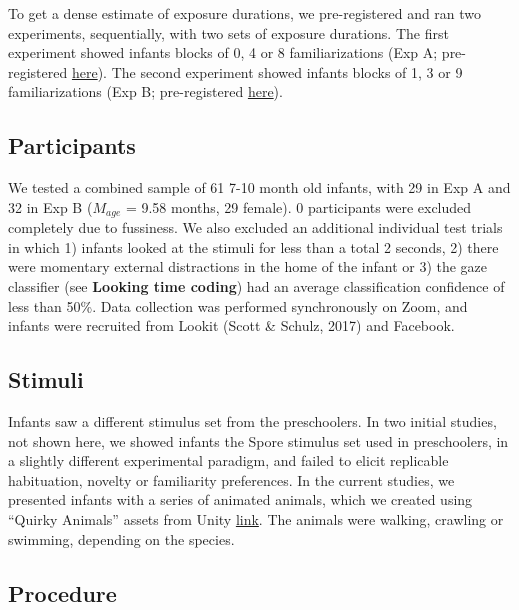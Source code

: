 \documentclass[10pt, letterpaper]{article}
\begin{document}
To get a dense estimate of exposure durations, we pre-registered and ran
two experiments, sequentially, with two sets of exposure durations. The
first experiment showed infants blocks of 0, 4 or 8 familiarizations
(Exp A; pre-registered
\href{https://osf.io/gux4f/?view_only=b4d6d0118dfa41a79fb431d389f4fecc}{here}).
The second experiment showed infants blocks of 1, 3 or 9
familiarizations (Exp B; pre-registered
\href{https://osf.io/w6pgu/?view_only=39ee108159884761a0c5bc68d11918df}{here}).

\hypertarget{participants-1}{%
\subsection{Participants}\label{participants-1}}

We tested a combined sample of 61 7-10 month old infants, with 29 in Exp
A and 32 in Exp B (\(M_{age}\) = 9.58 months, 29 female). 0 participants
were excluded completely due to fussiness. We also excluded an
additional individual test trials in which 1) infants looked at the
stimuli for less than a total 2 seconds, 2) there were momentary
external distractions in the home of the infant or 3) the gaze
classifier (see \textbf{Looking time coding}) had an average
classification confidence of less than 50\%. Data collection was
performed synchronously on Zoom, and infants were recruited from Lookit
(Scott \& Schulz, 2017) and Facebook.

\hypertarget{stimuli-1}{%
\subsection{Stimuli}\label{stimuli-1}}

Infants saw a different stimulus set from the preschoolers. In two
initial studies, not shown here, we showed infants the Spore stimulus
set used in preschoolers, in a slightly different experimental paradigm,
and failed to elicit replicable habituation, novelty or familiarity
preferences. In the current studies, we presented infants with a series
of animated animals, which we created using ``Quirky Animals'' assets
from Unity \href{https://tinyurl.com/469xxrn7}{link}. The animals were
walking, crawling or swimming, depending on the species.

\hypertarget{procedure}{%
\subsection{Procedure}\label{procedure}}
\end{document}
